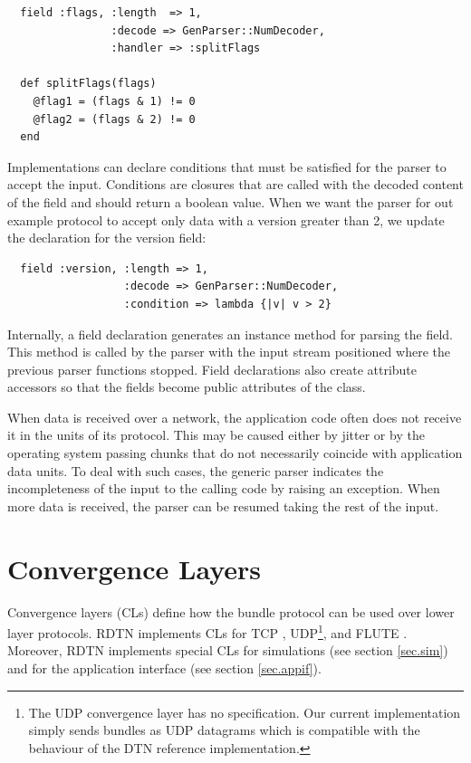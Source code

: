 \documentclass[a4paper]{article}
\begin{document}
\begin{verbatim}
  field :flags, :length  => 1,
                :decode => GenParser::NumDecoder,
                :handler => :splitFlags
  
  def splitFlags(flags)
    @flag1 = (flags & 1) != 0
    @flag2 = (flags & 2) != 0
  end
\end{verbatim}

Implementations can declare conditions that must be satisfied for the parser to
accept the input. Conditions are closures that are called with the decoded
content of the field and should return a boolean value.  When we want the parser
for out example protocol to accept only data with a version greater than 2, we
update the declaration for the version field:

\begin{verbatim}
  field :version, :length => 1,
                  :decode => GenParser::NumDecoder,
                  :condition => lambda {|v| v > 2}
\end{verbatim}

Internally, a field declaration generates an instance method for parsing the
field. This method is called by the parser with the input stream positioned
where the previous parser functions stopped. Field declarations also create
attribute accessors so that the fields become public attributes of the class.

When data is received over a network, the application code often does not
receive it in the units of its protocol. This may be caused either by jitter or
by the operating system passing chunks that do not necessarily coincide with
application data units. To deal with such cases, the generic parser indicates
the incompleteness of the input to the calling code by raising an exception.
When more data is received, the parser can be resumed taking the rest of the
input.

\section{Convergence Layers}\label{sec.cl}

Convergence layers (CLs) define how the bundle protocol can be used over lower
layer protocols. RDTN implements CLs for TCP \cite{dtn-tcp-cl}, UDP\footnote{The
UDP convergence layer has no specification. Our current implementation simply
sends bundles as UDP datagrams which is compatible with the behaviour of the DTN
reference implementation.}, and FLUTE \cite{uni-dtn}.  Moreover, RDTN implements
special CLs for simulations (see section \ref{sec.sim}) and for the application
interface (see section \ref{sec.appif}).
\end{document}
